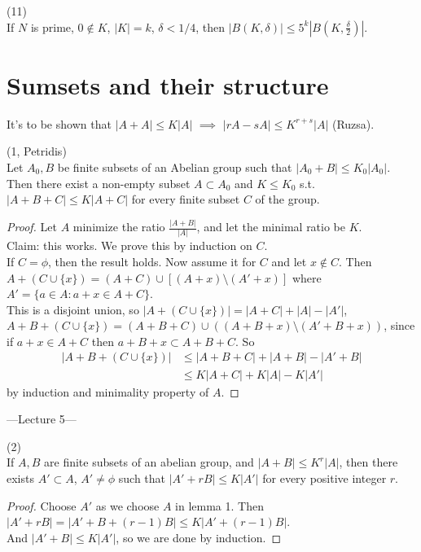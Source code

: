 \documentclass[a4paper]{article}
\begin{document}
\begin{coro} (11)\\
    If $N$ is prime, $0 \not \in K$, $|K| = k$, $\delta < 1/4$, then $|B(K,\delta)| \leq 5^k |B(K,\frac{\delta}{2})|$.
\end{coro}

\newpage

\section{Sumsets and their structure}
It's to be shown that $|A+A| \leq K|A|$ $\implies$ $|rA-sA| \leq K^{r+s}|A|$ (Ruzsa).

\begin{lemma} (1, Petridis)\\
    Let $A_0,B$ be finite subsets of an Abelian group such that $|A_0+B| \leq K_0|A_0|$. Then there exist a non-empty subset $A \subset A_0$ and $K \leq K_0$ s.t. $|A+B+C| \leq K|A+C|$ for every finite subset $C$ of the group.
    \begin{proof}
        Let $A$ minimize the ratio $\frac{|A+B|}{|A|}$, and let the minimal ratio be $K$.\\
        Claim: this works. We prove this by induction on $C$.\\
        If $C =\phi$, then the result holds. Now assume it for $C$ and let $x \not\in C$. Then $A+(C \cup \{x\}) = (A+C) \cup [(A+x) \setminus (A'+x)]$ where $A' = \{a \in A:a+x \in A+C\}$.\\
        This is a disjoint union, so $|A+(C\cup \{x\})| = |A+C|+|A|-|A'|$, $A+B+(C\cup\{x\}) = (A+B+C) \cup ((A+B+x)\setminus (A'+B+x))$, since if $a+x \in A+C$ then $a+B+x \subset A+B+C$. So
        \begin{equation*}
            \begin{aligned}
                |A+B+(C\cup\{x\})| &\leq |A+B+C|+|A+B|-|A'+B|\\
                &\leq K|A+C|+K|A|-K|A'|
            \end{aligned}
        \end{equation*}
        by induction and minimality property of $A$.
    \end{proof}
\end{lemma}

---Lecture 5---

\begin{coro} (2)\\
    If $A,B$ are finite subsets of an abelian group, and $|A+B| \leq K^r|A|$, then there exists $A'\subset A$, $A' \neq \phi$ such that $|A'+rB| \leq K|A'|$ for every positive integer $r$.
    \begin{proof}
        Choose $A'$ as we choose $A$ in lemma 1. Then $|A'+rB| = |A'+B+(r-1)B| \leq K|A'+(r-1)B|$.\\
        And $|A'+B| \leq K|A'|$, so we are done by induction.
    \end{proof}
\end{coro}
\end{document}
